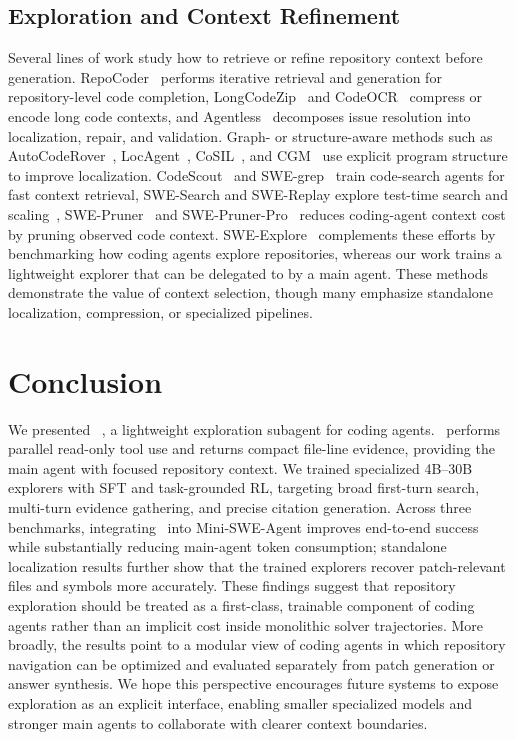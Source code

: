 \documentclass{llmxive}
\providecommand{\approach}{~}
\begin{document}
\subsection{Exploration and Context Refinement}
Several lines of work study how to retrieve or refine repository context before generation.
RepoCoder~\cite{repocoder} performs iterative retrieval and generation for repository-level code completion, LongCodeZip~\cite{longcodezip} and CodeOCR~\cite{codeocr} compress or encode long code contexts, and Agentless~\cite{agentless} decomposes issue resolution into localization, repair, and validation.
Graph- or structure-aware methods such as AutoCodeRover~\cite{autocoderover}, LocAgent~\cite{locagent}, CoSIL~\cite{cosil}, and CGM~\cite{cgm} use explicit program structure to improve localization.
CodeScout~\cite{codescout} and SWE-grep~\cite{swegrep} train code-search agents for fast context retrieval, SWE-Search and SWE-Replay explore test-time search and scaling~\cite{swesearch, swereplay}, SWE-Pruner~\cite{swepruner} and SWE-Pruner-Pro~\cite{sweprunerpro} reduces coding-agent context cost by pruning observed code context.
SWE-Explore~\cite{sweexplore} complements these efforts by benchmarking how coding agents explore repositories, whereas our work trains a lightweight explorer that can be delegated to by a main agent.
These methods demonstrate the value of context selection, though many emphasize standalone localization, compression, or specialized pipelines.


\section{Conclusion}
\vspace{-1.5mm}
We presented \approach, a lightweight exploration subagent for coding agents. \approach performs parallel read-only tool use and returns compact file-line evidence, providing the main agent with focused repository context.
We trained specialized 4B--30B explorers with SFT and task-grounded RL, targeting broad first-turn search, multi-turn evidence gathering, and precise citation generation. Across three benchmarks, integrating \approach into Mini-SWE-Agent improves end-to-end success while substantially reducing main-agent token consumption; standalone localization results further show that the trained explorers recover patch-relevant files and symbols more accurately. These findings suggest that repository exploration should be treated as a first-class, trainable component of coding agents rather than an implicit cost inside monolithic solver trajectories.
More broadly, the results point to a modular view of coding agents in which repository navigation can be optimized and evaluated separately from patch generation or answer synthesis.
We hope this perspective encourages future systems to expose exploration as an explicit interface, enabling smaller specialized models and stronger main agents to collaborate with clearer context boundaries.
\end{document}
